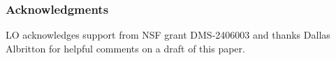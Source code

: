 \documentclass[11pt,reqno]{amsart}
\numberwithin{equation}{section}
\theoremstyle{definition}
\begin{document}

\subsubsection*{Acknowledgments} LO acknowledges support from NSF grant DMS-2406003 and thanks Dallas Albritton for helpful comments on a draft of this paper.



 


\end{document}
